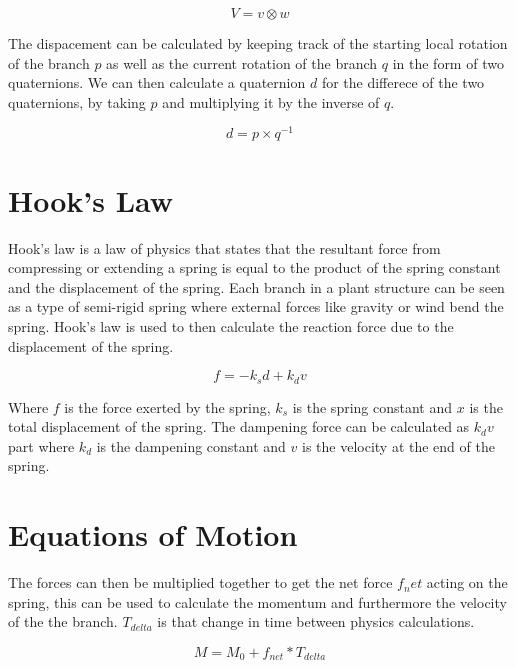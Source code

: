 \begin{equation}
V = v \otimes w
\end{equation}

\noindent
The dispacement can be calculated by keeping track of the starting local rotation of the branch $p$ as well as the current rotation of the branch $q$ in the form of two quaternions. We can then calculate a quaternion $d$ for the differece of the two quaternions, by taking $p$ and multiplying it by the inverse of $q$. 

\begin{equation}
d = p \times q^{-1}
\end{equation}

\section{Hook's Law}

Hook's law is a law of physics that states that the resultant force from compressing or extending a spring is equal to the product of the spring constant and the displacement of the spring. Each branch in a plant structure can be seen as a type of semi-rigid spring where external forces like gravity or wind bend the spring. Hook's law is used to then calculate the reaction force due to the displacement of the spring.

\begin{equation}
f = -k _s d + k _d v
\end{equation}

\noindent
Where $f$ is the force exerted by the spring, $k _s$ is the spring constant and $x$ is the total displacement of the spring. The dampening force can be calculated as $k _d v$ part where $k _d$ is the dampening constant and $v$ is the velocity at the end of the spring. 


\section{Equations of Motion} \label{motion equations}

The forces can then be multiplied together to get the net force $f_net$ acting on the spring, this can be used to calculate the momentum and furthermore the velocity of the the branch. $T_{delta}$ is that change in time between physics calculations.

\begin{equation}
M = M_0 + f_{net} * T_{delta}
\end{equation}

